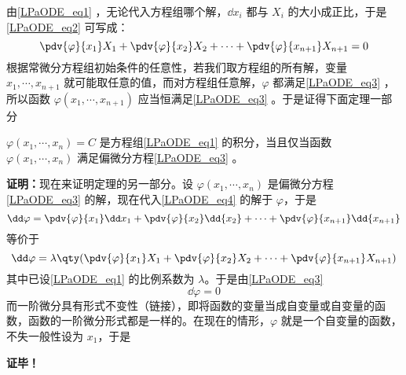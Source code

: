 由\autoref{LPaODE_eq1} ，无论代入方程组哪个解，$\dd x_i$ 都与 $X_i$ 的大小成正比，于是\autoref{LPaODE_eq2} 可写成：
\begin{equation}\label{LPaODE_eq3}
\pdv{\varphi}{x_1}X_1+\pdv{\varphi}{x_2}X_2+\cdots+\pdv{\varphi}{x_{n+1}}X_{n+1}=0
\end{equation}
根据常微分方程组初始条件的任意性，若我们取方程组的所有解，变量 $x_1,\cdots,x_{n+1}$ 就可能取任意的值，而对方程组任意解，$\varphi$ 都满足\autoref{LPaODE_eq3} ，所以函数 $\varphi(x_1,\cdots,x_{n+1})$ 应当恒满足\autoref{LPaODE_eq3} 。于是证得下面定理一部分
\begin{theorem}{}
 $\varphi(x_1,\cdots,x_n)=C$ 是方程组\autoref{LPaODE_eq1} 的积分，当且仅当函数 $\varphi(x_1,\cdots,x_n)$ 满足偏微分方程\autoref{LPaODE_eq3} 。
\end{theorem}
 \textbf{证明：}现在来证明定理的另一部分。设 $\varphi(x_1,\cdots,x_n)$ 是偏微分方程\autoref{LPaODE_eq3} 的解，现在代入\autoref{LPaODE_eq4} 的解于 $\varphi$，于是
 \begin{equation}
 \dd\varphi=\pdv{\varphi}{x_1}\dd x_1+\pdv{\varphi}{x_2}\dd{x_2}+\cdots+\pdv{\varphi}{x_{n+1}}\dd{x_{n+1}}
 \end{equation}
 等价于
 \begin{equation}
 \dd\varphi=\lambda\qty(\pdv{\varphi}{x_1}X_1+\pdv{\varphi}{x_2}X_2+\cdots+\pdv{\varphi}{x_{n+1}}X_{n+1})
 \end{equation}
 其中已设\autoref{LPaODE_eq1} 的比例系数为 $\lambda$。于是由\autoref{LPaODE_eq3} 
 \begin{equation}
 \dd\varphi=0
 \end{equation}
 而一阶微分具有形式不变性（链接），即将函数的变量当成自变量或自变量的函数，函数的一阶微分形式都是一样的。在现在的情形，$\varphi$ 就是一个自变量的函数，不失一般性设为 $x_1$，于是 

 \textbf{证毕！}